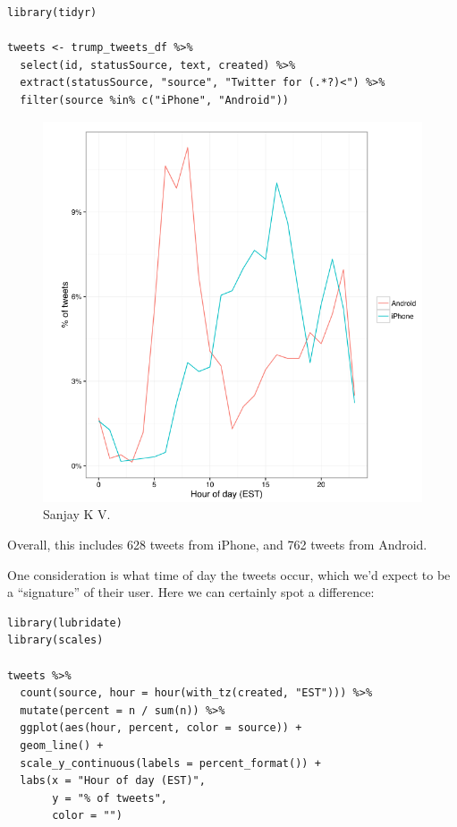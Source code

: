 \documentclass[a4paper,12pt]{article}
\begin{document}
\begin{lstlisting}
library(tidyr)

tweets <- trump_tweets_df %>%
  select(id, statusSource, text, created) %>%
  extract(statusSource, "source", "Twitter for (.*?)<") %>%
  filter(source %in% c("iPhone", "Android"))
  \end{lstlisting}

  
  \begin{figure}[h!]
  \includegraphics[width=\linewidth]{Chunk.png}
  \caption{Sanjay K V.}
  \label{fig:Tweet by Todd Vaziri}
\end{figure}
Overall, this includes 628 tweets from iPhone, and 762 tweets from Android.

One consideration is what time of day the tweets occur, which we’d expect to be a “signature” of their user. Here we can certainly spot a difference:



\begin{lstlisting}
library(lubridate)
library(scales)

tweets %>%
  count(source, hour = hour(with_tz(created, "EST"))) %>%
  mutate(percent = n / sum(n)) %>%
  ggplot(aes(hour, percent, color = source)) +
  geom_line() +
  scale_y_continuous(labels = percent_format()) +
  labs(x = "Hour of day (EST)",
       y = "% of tweets",
       color = "")
  \end{lstlisting}
\end{document}
